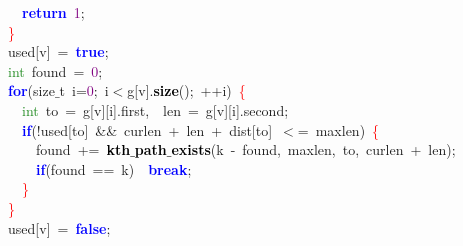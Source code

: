 {{\mbox{}\ \ \ \ \textbf{\textcolor{Blue}{return}}\ \textcolor{Purple}{1}\textcolor{BrickRed}{;} \\
\mbox{}\ \ \textcolor{Red}{\}} \\
\mbox{}\ \ used\textcolor{BrickRed}{[}v\textcolor{BrickRed}{]}\ \textcolor{BrickRed}{=}\ \textbf{\textcolor{Blue}{true}}\textcolor{BrickRed}{;} \\
\mbox{}\ \ \textcolor{ForestGreen}{int}\ found\ \textcolor{BrickRed}{=}\ \textcolor{Purple}{0}\textcolor{BrickRed}{;} \\
\mbox{}\ \ \textbf{\textcolor{Blue}{for}}\textcolor{BrickRed}{(}\textcolor{TealBlue}{size$\_$t}\ i\textcolor{BrickRed}{=}\textcolor{Purple}{0}\textcolor{BrickRed}{;}\ i\textcolor{BrickRed}{$<$}g\textcolor{BrickRed}{[}v\textcolor{BrickRed}{].}\textbf{\textcolor{Black}{size}}\textcolor{BrickRed}{();}\ \textcolor{BrickRed}{++}i\textcolor{BrickRed}{)}\ \textcolor{Red}{\{} \\
\mbox{}\ \ \ \ \textcolor{ForestGreen}{int}\ to\ \textcolor{BrickRed}{=}\ g\textcolor{BrickRed}{[}v\textcolor{BrickRed}{][}i\textcolor{BrickRed}{].}first\textcolor{BrickRed}{,}\ \ len\ \textcolor{BrickRed}{=}\ g\textcolor{BrickRed}{[}v\textcolor{BrickRed}{][}i\textcolor{BrickRed}{].}second\textcolor{BrickRed}{;} \\
\mbox{}\ \ \ \ \textbf{\textcolor{Blue}{if}}\textcolor{BrickRed}{(!}used\textcolor{BrickRed}{[}to\textcolor{BrickRed}{]}\ \textcolor{BrickRed}{\&\&}\ curlen\ \textcolor{BrickRed}{+}\ len\ \textcolor{BrickRed}{+}\ dist\textcolor{BrickRed}{[}to\textcolor{BrickRed}{]}\ \textcolor{BrickRed}{$<$=}\ maxlen\textcolor{BrickRed}{)}\ \textcolor{Red}{\{} \\
\mbox{}\ \ \ \ \ \ found\ \textcolor{BrickRed}{+=}\ \textbf{\textcolor{Black}{kth$\_$path$\_$exists}}\textcolor{BrickRed}{(}k\ \textcolor{BrickRed}{-}\ found\textcolor{BrickRed}{,}\ maxlen\textcolor{BrickRed}{,}\ to\textcolor{BrickRed}{,}\ curlen\ \textcolor{BrickRed}{+}\ len\textcolor{BrickRed}{);} \\
\mbox{}\ \ \ \ \ \ \textbf{\textcolor{Blue}{if}}\textcolor{BrickRed}{(}found\ \textcolor{BrickRed}{==}\ k\textcolor{BrickRed}{)}\ \ \textbf{\textcolor{Blue}{break}}\textcolor{BrickRed}{;} \\
\mbox{}\ \ \ \ \textcolor{Red}{\}} \\
\mbox{}\ \ \textcolor{Red}{\}} \\
\mbox{}\ \ used\textcolor{BrickRed}{[}v\textcolor{BrickRed}{]}\ \textcolor{BrickRed}{=}\ \textbf{\textcolor{Blue}{false}}\textcolor{BrickRed}{;} \\
}}
